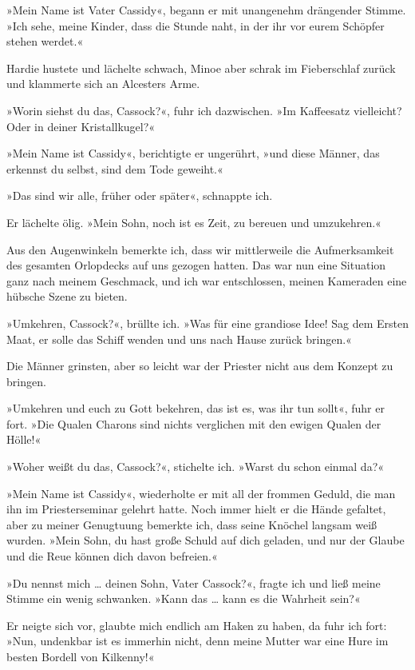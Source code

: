 »Mein Name ist Vater Cassidy«, begann er mit unangenehm drängender
Stimme. »Ich sehe, meine Kinder, dass die Stunde naht, in der ihr
vor eurem Schöpfer stehen werdet.«

Hardie hustete und lächelte schwach, Minoe aber schrak im
Fieberschlaf zurück und klammerte sich an Alcesters Arme.

»Worin siehst du das, Cassock?«, fuhr ich dazwischen. »Im
Kaffeesatz vielleicht? Oder in deiner Kristallkugel?«

»Mein Name ist Cassidy«, berichtigte er ungerührt, »und diese
Männer, das erkennst du selbst, sind dem Tode geweiht.«

»Das sind wir alle, früher oder später«, schnappte ich.

Er lächelte ölig. »Mein Sohn, noch ist es Zeit, zu bereuen und
umzukehren.«

Aus den Augenwinkeln bemerkte ich, dass wir mittlerweile die
Aufmerksamkeit des gesamten Orlopdecks auf uns gezogen hatten. Das
war nun eine Situation ganz nach meinem Geschmack, und ich war
entschlossen, meinen Kameraden eine hübsche Szene zu bieten.

»Umkehren, Cassock?«, brüllte ich. »Was für eine grandiose Idee!
Sag dem Ersten Maat, er solle das Schiff wenden und uns nach Hause
zurück bringen.«

Die Männer grinsten, aber so leicht war der Priester nicht aus dem
Konzept zu bringen.

»Umkehren und euch zu Gott bekehren, das ist es, was ihr tun
sollt«, fuhr er fort. »Die Qualen Charons sind nichts verglichen
mit den ewigen Qualen der Hölle!«

»Woher weißt du das, Cassock?«, stichelte ich. »Warst du schon
einmal da?«

»Mein Name ist Cassidy«, wiederholte er mit all der frommen Geduld,
die man ihn im Priesterseminar gelehrt hatte. Noch immer hielt er
die Hände gefaltet, aber zu meiner Genugtuung bemerkte ich, dass
seine Knöchel langsam weiß wurden. »Mein Sohn, du hast große Schuld
auf dich geladen, und nur der Glaube und die Reue können dich davon
befreien.«

»Du nennst mich \ldots{} deinen Sohn, Vater Cassock?«, fragte ich und
ließ meine Stimme ein wenig schwanken. »Kann das \ldots{} kann es die
Wahrheit sein?«

Er neigte sich vor, glaubte mich endlich am Haken zu haben, da fuhr
ich fort: »Nun, undenkbar ist es immerhin nicht, denn meine Mutter
war eine Hure im besten Bordell von Kilkenny!«

